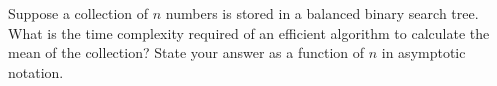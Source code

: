 \Needspace{1.5in}
\begin{prob}
    Suppose a collection of $n$ numbers is stored in a balanced binary
    search tree. What is the time complexity required of an efficient algorithm
    to calculate the mean of the collection? State your answer as a function of
    $n$ in asymptotic notation.


\end{prob}
